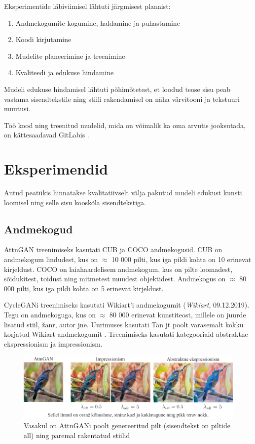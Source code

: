 \documentclass{vilgym}
\begin{document}
	Eksperimentide läbiviimisel lähtuti järgmisest plaanist:
	\begin{enumerate}
		\item Andmekogumite kogumine, haldamine ja puhastamine
		\item Koodi kirjutamine 
		\item Mudelite planeerimine ja treenimine
		\item Kvaliteedi ja edukuse hindamine
	\end{enumerate}

	Mudeli edukuse hindamisel lähtuti põhimõtetest, et loodud teose sisu peab vastama sisendtekstile ning stiili rakendamisel on näha värvitooni ja tekstuuri muutusi.

	Töö kood ning treenitud mudelid, mida on võimalik ka oma arvutis jooksutada, on kättesaadavad GitLabis \parencite{text2art-gan}.

	\section{Eksperimendid}
	Antud peatükis hinnatakse kvalitatiivselt välja pakutud mudeli edukust kunsti loomisel ning selle sisu kooskõla sisendtekstiga. 

	\subsection{Andmekogud}
	AttnGAN treenimiseks kasutati CUB \parencite{cub} ja COCO \parencite{srgan} andmekogusid. CUB on andmekogum lindudest, kus on $\approx$ 10 000 pilti, kus iga pildi kohta on 10 erinevat kirjeldust. COCO on laiahaardelisem andmekogum, kus on pilte loomadest, sõidukitest, toidust ning mitmetest muudest objektidest. Andmekogus on $\approx$ 80 000 pilti, kus iga pildi kohta on 5 erinevat kirjeldust.

	CycleGANi treenimiseks kasutati Wikiart'i andmekogumit (\textit{Wikiart}, 09.12.2019). Tegu on andmekoguga, kus on $\approx$ 80 000 erinevat kunstiteost, millele on juurde lisatud stiil, žanr, autor jne. Uurimuses kasutati Tan jt poolt varasemalt kokku korjatud Wikiart andmekogumit \parencite{artgan}. Treenimiseks kasutati kategooriaid abstraktne ekspressionism ja impressionism.

	\begin{figure}
		\includegraphics[width=\linewidth]{images/linnud.jpg}
		\caption{Vasakul on AttnGANi poolt genereeritud pilt (sisendtekst on piltide all) ning paremal rakentatud stiilid}
		\label{fig:cub}
	\end{figure}
\end{document}
